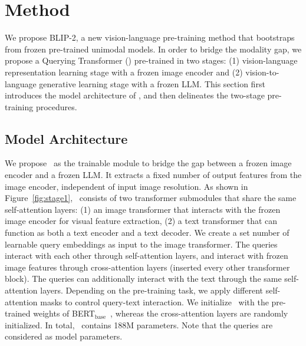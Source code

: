 \vspace{-1.5ex}
\section{Method}
\label{sec:method}
\vspace{-0.5ex}



We propose BLIP-2, a new vision-language pre-training method that bootstraps from frozen pre-trained unimodal models.
In order to bridge the modality gap,
we propose a Querying Transformer (\name) pre-trained in two stages:
(1) vision-language representation learning stage with a frozen image encoder and (2) vision-to-language generative learning stage with a frozen LLM.
This section first introduces the model architecture of \name,
and then delineates the two-stage pre-training procedures.

\vspace{-0.5ex}
\subsection{Model Architecture}
\vspace{-0.5ex}
We propose \name~as the trainable module to bridge the gap between a frozen image encoder and a frozen LLM.
It extracts a fixed number of output features from the image encoder,
independent of input image resolution.
As shown in Figure~\ref{fig:stage1},
\name~consists of two transformer submodules that share the same self-attention layers: (1) an image transformer that interacts with the frozen image encoder for visual feature extraction, (2) a text transformer that can function as both a text encoder and a text decoder.
We create a set number of learnable query embeddings as input to the image transformer.
%
The queries interact with each other through self-attention layers, and interact with frozen image features through cross-attention layers (inserted every other transformer block).
The queries can additionally interact with the text through the same self-attention layers.
Depending on the pre-training task,
we apply different self-attention masks to control query-text interaction.
We initialize \name~with the pre-trained weights of BERT$_\text{base}$~\cite{bert}, whereas the cross-attention layers are randomly initialized. 
In total, \name~contains 188M parameters.
Note that the queries are considered as model parameters.

